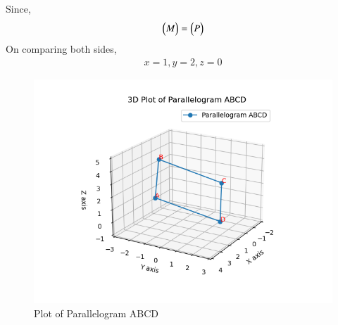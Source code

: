 \documentclass[journal]{IEEEtran}
\begin{document}
Since,
\begin{align}
\begin{pmatrix}M\end{pmatrix} = \begin{pmatrix}P\end{pmatrix} \\
\end{align}
On comparing both sides, 
\begin{align}
x=1, y=2, z=0
\end{align}
\begin{figure}[h!]
   \centering
   \includegraphics[width=0.7\linewidth]{figs/Figure_1.png}
   \caption{Plot of Parallelogram ABCD}
   \label{stemplot}
\end{figure}
\end{document}
